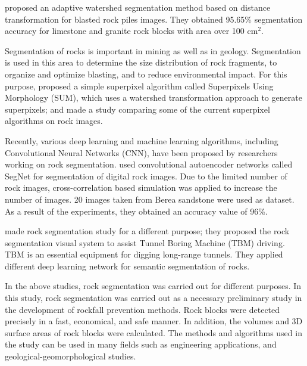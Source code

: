\documentclass[a4paper,fleqn]{cas-sc}
\begin{document}
\cite{guo2022method} proposed an adaptive watershed segmentation method based on distance transformation for blasted rock piles images. They obtained 95.65\% segmentation accuracy for limestone and granite rock blocks with area over 100 cm$^2$. 

Segmentation of rocks is important in mining as well as in geology. Segmentation is used in this area to determine the size distribution of rock fragments, to organize and optimize blasting, and to reduce environmental impact. For this purpose, \cite{malladi2014superpixels} proposed a simple superpixel algorithm called Superpixels Using Morphology (SUM), which uses a watershed transformation approach to generate superpixels; and made a study comparing some of the current superpixel algorithms on rock images.

Recently, various deep learning and machine learning algorithms, including Convolutional Neural Networks (CNN), have been proposed by researchers working on rock segmentation. \cite{karimpouli2019segmentation} used convolutional autoencoder networks called SegNet for segmentation of digital rock images. Due to the limited number of rock images, cross-correlation based simulation was applied to increase the number of images. 20 images taken from Berea sandstone were used as dataset. As a result of the experiments, they obtained an accuracy value of 96\%.

\cite{xue2021rock} made rock segmentation study for a different purpose; they proposed the rock segmentation visual system to assist Tunnel Boring Machine (TBM) driving. TBM is an essential equipment for digging long-range tunnels. They applied different deep learning network for semantic segmentation of rocks.

In the above studies, rock segmentation was carried out for different purposes. In this study, rock segmentation was carried out as a necessary preliminary study in the development of rockfall prevention methods. Rock blocks were detected precisely in a fast, economical, and safe manner. In addition, the volumes and 3D surface areas of rock blocks were calculated. The methods and algorithms used in the study can be used in many fields such as engineering applications, and geological-geomorphological studies.
\end{document}

